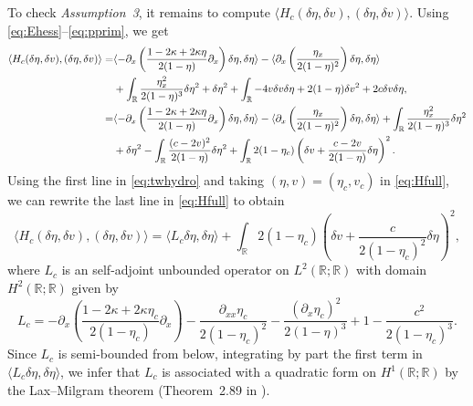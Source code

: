 \documentclass[11pt]{article}
\newcommand{\R}{\mathbb{R}}
\theoremstyle{plain}
\theoremstyle{definition}
\theoremstyle{remark}
\numberwithin{equation}{section}
\begin{document}
{	
	
	To check \textit{Assumption~3}, it remains to compute $\langle H_c(\delta\eta,\delta v),(\delta\eta,\delta v)\rangle$. Using \eqref{eq:Ehess}--\eqref{eq:pprim}, we get
	\begin{align}\label{eq:Hfull}
		\langle H_c(\delta\eta,\delta v),(\delta\eta,\delta\notag v)\rangle=&\langle-\partial_x\left(\frac{1-2\kappa+2\kappa\eta}{2(1-\eta)}\partial_{x}\right)\delta\eta,\delta\eta\rangle
		-\langle\partial_{x}\left(\frac{\eta_x}{2(1-\eta)^2}\right)\delta\eta,\delta\eta\rangle\\
		&+\int_\R \frac{\eta_x^2}{2(1-\eta)^3}\delta\eta^2+
		\delta\eta^2
		+\int_\R-4v\delta v\delta\eta+2(1-\eta)\delta v^2+2c\delta v\delta\eta,\notag\\
		=&\langle-\partial_x\left(\frac{1-2\kappa+2\kappa\eta}{2(1-\eta)}\partial_{x}\right)\delta\eta,\delta\eta\rangle
		-\langle\partial_{x}\left(\frac{\eta_x}{2(1-\eta)^2}\right)\delta\eta,\delta\eta\rangle
		+\int_\R \frac{\eta_x^2}{2(1-\eta)^3}\delta\eta^2\notag\\&+
		\delta\eta^2
		-\int_\R\frac{(c-2v)^2}{2(1-\eta)}\delta\eta^2+\int_\R2(1-\eta_c)\left(\delta v+\frac{c-2v}{2(1-\eta)}\delta\eta\right)^2.
	\end{align} 
	Using the first line in \eqref{eq:twhydro} and taking $(\eta,v)=(\eta_c,v_c)$ in \eqref{eq:Hfull}, we can rewrite the last line in \eqref{eq:Hfull} to obtain
	\begin{equation}\label{eq:H}
		\langle H_c(\delta\eta,\delta v),(\delta\eta,\delta v)\rangle=\langle L_c\delta\eta,\delta\eta\rangle+\int_\R2(1-\eta_c)\left(\delta v+\frac{c}{2(1-\eta_c)^2}\delta\eta\right)^2,
	\end{equation}
	where $L_c$ is an self-adjoint unbounded operator on $ L^2(\R;\R)$ with domain $ H^2(\R;\R)$ given by
	\begin{equation}\label{eq:L}
		L_c=-\partial_x\left(\frac{1-2\kappa+2\kappa\eta_c}{2(1-\eta_c)}\partial_{x}\right)-\frac{\partial_{xx}\eta_c}{2(1-\eta_c)^2}-\frac{(\partial_x\eta_c)^2}{2(1-\eta)^3}+1-\frac{c^2}{2(1-\eta_c)^3}.
	\end{equation}
	Since $L_c$ is semi-bounded from below, integrating by part the first term in $\langle L_c\delta\eta,\delta\eta\rangle$, we infer that $L_c$ is associated with a quadratic form on $ H^1(\R;\R)$ by the Lax--Milgram theorem (Theorem~2.89 in \cite{spectraltheorybook}).
	
}
\end{document}
